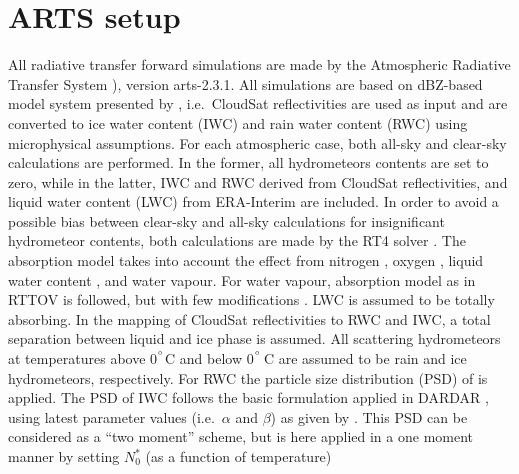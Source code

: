 \documentclass[amt, manuscript]{copernicus}
\begin{document}


\appendix
\section{ARTS setup}    %
\label{appendix:ARTS_setup}
%
All radiative transfer forward simulations are made by the Atmospheric Radiative
Transfer System \citep[ARTS,][]{eriksson:arts2:11,buehler:artst:18}), version
arts-2.3.1. All simulations are based on dBZ-based model system presented by \citet{ekelund2020using}, i.e.\ CloudSat reflectivities are used as input and are converted to ice water content (IWC) and rain water content (RWC) using microphysical assumptions. For each atmospheric case, both all-sky and clear-sky calculations are performed. In the former, all hydrometeors contents are set to zero, while in the latter, IWC and RWC derived from CloudSat reflectivities, and liquid water content (LWC) from ERA-Interim \citep{dee2011erainterim} are included. In order to avoid a possible bias between clear-sky and all-sky calculations for insignificant hydrometeor contents, both calculations are made by the RT4 solver \citep{evans1995microwavec}. The absorption model takes into account the effect from nitrogen
\citep{pwr:93}, oxygen \citep{pwr:93}, liquid water content \citep[LWC,][]{ellison2007permittivity}, and water vapour. For water vapour, absorption model as  in RTTOV \citep[Radiative transfer for TOVS,][]{saunders2018update} is followed, but with few modifications \citep{turner2019amsutran}. LWC is assumed to be totally absorbing. In the mapping of CloudSat reflectivities to RWC and IWC, a total separation between liquid and ice phase is assumed. All scattering hydrometeors at temperatures above 0$^{^{\circ}}$C and below 0$^{^{\circ}}$\,C are assumed to be rain and ice hydrometeors, respectively. For RWC the particle size distribution (PSD) of \citet{abel2012improved} is applied. The PSD of IWC follows the basic formulation applied in DARDAR \citep[\url{
	http://www.icare.univ-lille1.fr/projects/dardar}][]{delanoe2008variational}, using latest parameter values (i.e.\ $\alpha$ and $\beta$) as given by \citet{cazenave2019evolution}.
This PSD can be considered as a ``two moment'' scheme, but is here applied in
a one moment manner by setting $N_0^*$ (as a function of temperature)
\end{document}
